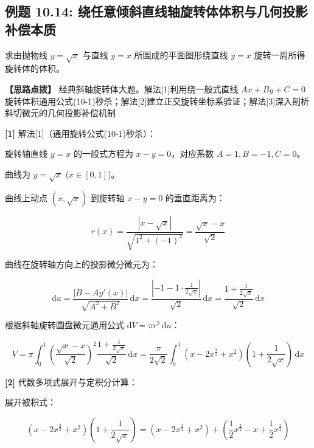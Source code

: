 \documentclass[11pt,a4paper,UTF8]{ctexart}
\begin{document}
\subsection{例题 10.14: 绕任意倾斜直线轴旋转体体积与几何投影补偿本质}

求由抛物线 $y = \sqrt{x}$ 与直线 $y = x$ 所围成的平面图形绕直线 $y = x$ 旋转一周所得旋转体的体积。

\textbf{\color{DeepPurple}【思路点拨】} 经典斜轴旋转体大题。解法[1]利用绕一般式直线 $Ax+By+C=0$ 旋转体积通用公式(10-1)秒杀；解法[2]建立正交旋转坐标系验证；解法[3]深入剖析斜切微元的几何投影补偿机制


\begin{solbox}[分步推导与答题规范]
\textbf{[1]} 解法[1]（通用旋转公式(10-1)秒杀）：

旋转轴直线 $y = x$ 的一般式方程为 $x - y = 0$，对应系数 $A = 1, B = -1, C = 0$。

曲线为 $y = \sqrt{x}$ ($x \in [0, 1]$)。

曲线上动点 $(x, \sqrt{x})$ 到旋转轴 $x - y = 0$ 的垂直距离为：


\begin{equation*}
r(x) = \frac{|x - \sqrt{x}|}{\sqrt{1^2 + (-1)^2}} = \frac{\sqrt{x} - x}{\sqrt{2}}
\end{equation*}


曲线在旋转轴方向上的投影微分微元为：


\begin{equation*}
\mathrm{d}u = \frac{|B - A y'(x)|}{\sqrt{A^2+B^2}}\,\mathrm{d}x = \frac{\left|-1 - 1 \cdot \frac{1}{2\sqrt{x}}\right|}{\sqrt{2}}\,\mathrm{d}x = \frac{1 + \frac{1}{2\sqrt{x}}}{\sqrt{2}}\,\mathrm{d}x
\end{equation*}


根据斜轴旋转圆盘微元通用公式 $\mathrm{d}V = \pi r^2\,\mathrm{d}u$：


\begin{equation*}
V = \pi \int_0^1 \left(\frac{\sqrt{x}-x}{\sqrt{2}}\right)^2 \frac{1 + \frac{1}{2\sqrt{x}}}{\sqrt{2}}\,\mathrm{d}x = \frac{\pi}{2\sqrt{2}} \int_0^1 (x - 2x^{\frac{3}{2}} + x^2) \left(1 + \frac{1}{2\sqrt{x}}\right)\,\mathrm{d}x
\end{equation*}


\textbf{[2]} 代数多项式展开与定积分计算：

展开被积式：


\begin{equation*}
(x - 2x^{\frac{3}{2}} + x^2) \left(1 + \frac{1}{2\sqrt{x}}\right) = (x - 2x^{\frac{3}{2}} + x^2) + \left(\frac{1}{2}x^{\frac{1}{2}} - x + \frac{1}{2}x^{\frac{3}{2}}\right)
\end{equation*}




\end{solbox}
\end{document}
